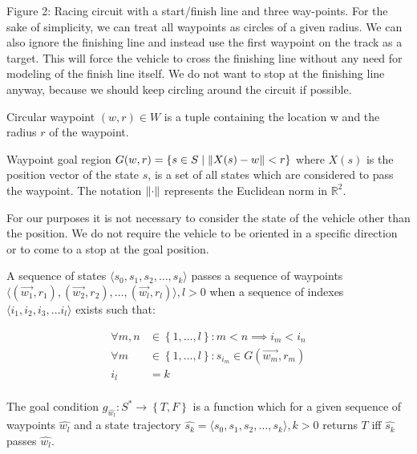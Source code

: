 Figure 2: Racing circuit with a start/finish line and three way-points.
For the sake of simplicity, we can treat all waypoints as circles of a given radius. We can also ignore the finishing line and instead use the first waypoint on the track as a target. This will force the vehicle to cross the finishing line without any need for modeling of the finish line itself. We do not want to stop at the finishing line anyway, because we should keep circling around the circuit if possible.

\begin{defn}
	Circular waypoint $\left(w,r\right)\in W$ is a tuple containing the location w and the radius $r$ of the waypoint.
\end{defn}

\begin{defn}[Waypoint]
	Waypoint goal region $G(w,r)=\left\{s\in S \mid \left\lVert X(s)-w\right\rVert<r\right\}$ where $X(s)$ is the position vector of the state $s$, is a set of all states which are considered to pass the waypoint. The notation $\left\lVert\cdot\right\rVert$ represents the Euclidean norm in $\mathbb{R}^2$.
\end{defn}
	
For our purposes it is not necessary to consider the state of the vehicle other than the position. We do not require the vehicle to be oriented in a specific direction or to come to a stop at the goal position.

\begin{defn}
	A sequence of states $\langle s_0,s_1,s_2,\ldots,s_k\rangle$ passes a sequence of waypoints $\langle \left(\vec{w_1}, r_1\right), \left(\vec{w_2}, r_2\right), \ldots, \left(\vec{w_l}, r_l\right) \rangle, l > 0$ when a sequence of indexes $\langle i_1,i_2,i_3, \ldots i_l \rangle$ exists such that:

	\begin{equation*}
		\begin{aligned}
			\forall m,n &\in \left\{1,\ldots,l\right\}: m<n\implies i_m < i_n \\
			\forall m &\in \left\{1,\ldots,l\right\}: s_{i_m}\in G(\vec{w_m}, r_m) \\
			i_l &= k \\
		\end{aligned}
	\end{equation*}
\end{defn}

\begin{defn}
	The goal condition $g_{\hat{w_l}}: S^* \rightarrow \left\{T,F\right\}$ is a function which for a given sequence of waypoints $\hat{w_l}$ and a state trajectory  $\hat{s_k}=\langle s_0,s_1,s_2,\ldots, s_k\rangle, k>0$ returns $T$ iff $\hat{s_k}$ passes $\hat{w_l}$.
\end{defn}
	
